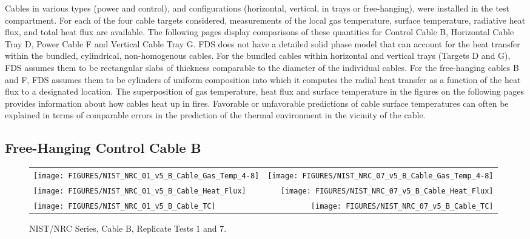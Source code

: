 Cables in various types (power and control), and configurations (horizontal, vertical, in trays or free-hanging), were installed in
the test compartment.
For each of the four cable targets considered, measurements of the local gas temperature, surface temperature, radiative heat flux,
and total heat flux are available.  The following pages display comparisons of these quantities for
Control Cable B, Horizontal Cable Tray D, Power Cable F and Vertical Cable Tray G.
FDS does not have a detailed solid phase model that can account for the heat transfer within the bundled,
cylindrical, non-homogenous cables.  For the bundled cables within horizontal and vertical trays (Targets D and G),
FDS assumes them to be rectangular slabs of thickness comparable to the diameter of the individual cables.
For the free-hanging cables B and F, FDS assumes them to be cylinders of uniform composition into which it
computes the radial heat transfer as a function of the heat flux to a designated location.
The superposition of gas temperature, heat flux and surface temperature in the figures on the following pages
provides information about how cables heat up in fires.  Favorable or unfavorable predictions of cable surface
temperatures can often be explained in terms of comparable errors in the prediction of the thermal environment in the vicinity of the cable.

\clearpage

\subsection{Free-Hanging Control Cable B}

\vspace{1in}

\begin{figure}[h!]
\begin{tabular*}{\textwidth}{l@{\extracolsep{\fill}}r}
\texttt{[image: FIGURES/NIST\_NRC\_01\_v5\_B\_Cable\_Gas\_Temp\_4-8]} &
\texttt{[image: FIGURES/NIST\_NRC\_07\_v5\_B\_Cable\_Gas\_Temp\_4-8]} \\
\texttt{[image: FIGURES/NIST\_NRC\_01\_v5\_B\_Cable\_Heat\_Flux]} &
\texttt{[image: FIGURES/NIST\_NRC\_07\_v5\_B\_Cable\_Heat\_Flux]} \\
\texttt{[image: FIGURES/NIST\_NRC\_01\_v5\_B\_Cable\_TC]} &
\texttt{[image: FIGURES/NIST\_NRC\_07\_v5\_B\_Cable\_TC]}
\end{tabular*}
\caption{NIST/NRC Series, Cable B, Replicate Tests 1 and 7.}
\label{NIST_NRC_B_1_and_7}
\end{figure}


